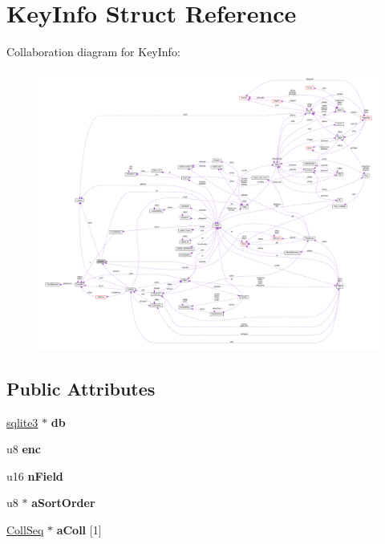 \hypertarget{struct_key_info}{\section{Key\-Info Struct Reference}
\label{struct_key_info}
}


Collaboration diagram for Key\-Info\-:\nopagebreak
\begin{figure}[H]
\begin{center}
\leavevmode
\includegraphics[width=350pt]{struct_key_info__coll__graph}
\end{center}
\end{figure}
\subsection*{Public Attributes}
\begin{DoxyCompactItemize}
\item 
\hypertarget{struct_key_info_af2e7a3a411f5ca1ccf6de77d320b59db}{\hyperlink{structsqlite3}{sqlite3} $\ast$ {\bfseries db}}\label{struct_key_info_af2e7a3a411f5ca1ccf6de77d320b59db}

\item 
\hypertarget{struct_key_info_a37972825f9a148668e979be12465e832}{u8 {\bfseries enc}}\label{struct_key_info_a37972825f9a148668e979be12465e832}

\item 
\hypertarget{struct_key_info_af70436487a95e445d540bfc4ca1d3f0b}{u16 {\bfseries n\-Field}}\label{struct_key_info_af70436487a95e445d540bfc4ca1d3f0b}

\item 
\hypertarget{struct_key_info_ac5fe4bd0172a1f11f41f678528a7b21e}{u8 $\ast$ {\bfseries a\-Sort\-Order}}\label{struct_key_info_ac5fe4bd0172a1f11f41f678528a7b21e}

\item 
\hypertarget{struct_key_info_ad43aa024fca5a065e75d8e24b231adcb}{\hyperlink{struct_coll_seq}{Coll\-Seq} $\ast$ {\bfseries a\-Coll} \mbox{[}1\mbox{]}}\label{struct_key_info_ad43aa024fca5a065e75d8e24b231adcb}

\end{DoxyCompactItemize}


